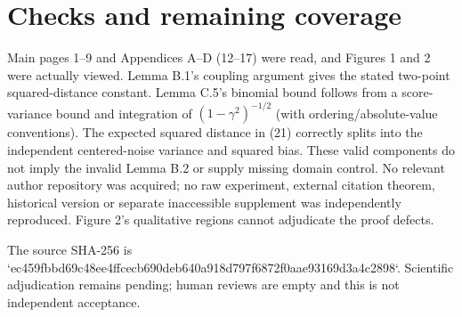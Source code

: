 \documentclass[10pt]{article}
\begin{document}
\section*{Checks and remaining coverage}
Main pages 1–9 and Appendices A–D (12–17) were read, and Figures 1 and 2 were actually viewed. Lemma B.1’s coupling argument gives the stated two-point squared-distance constant. Lemma C.5’s binomial bound follows from a score-variance bound and integration of \((1-\gamma^2)^{-1/2}\) (with ordering/absolute-value conventions). The expected squared distance in (21) correctly splits into the independent centered-noise variance and squared bias. These valid components do not imply the invalid Lemma B.2 or supply missing domain control. No relevant author repository was acquired; no raw experiment, external citation theorem, historical version or separate inaccessible supplement was independently reproduced. Figure 2’s qualitative regions cannot adjudicate the proof defects.\par
The source SHA-256 is `ec459fbbd69c48ee4ffcecb690deb640a918d797f6872f0aae93169d3a4c2898`. Scientific adjudication remains pending; human reviews are empty and this is not independent acceptance.\par
\end{document}

